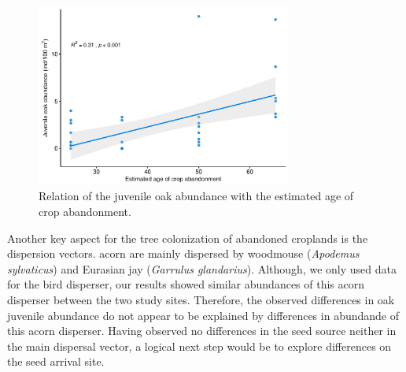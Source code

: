 \begin{figure}
    \centering
    \includegraphics[width=\textwidth,height=6cm,
  keepaspectratio]{img/coloniza/coloniza-ageCrop.pdf}
    \caption{Relation of the juvenile oak abundance with the estimated age of crop abandonment.}
    \label{fig:coloniza:ageCrop}
\end{figure}

Another key aspect for the tree colonization of abandoned croplands is the dispersion vectors. \Qp acorn are mainly dispersed by woodmouse (\emph{Apodemus sylvaticus}) and Eurasian jay (\emph{Garrulus glandarius})\autocites{Gomez2003ImpactVertebrate,Pereaetal2014InteraccionesPlantaanimal}. Although, we only used data for the bird disperser, our results showed similar abundances of this acorn disperser between the two study sites. Therefore, the observed differences in oak juvenile abundance do not appear to be explained by differences in abundande of this acorn disperser. Having observed no differences in the seed source neither in the main dispersal vector, a logical next step would be to explore differences on the seed arrival site. 

